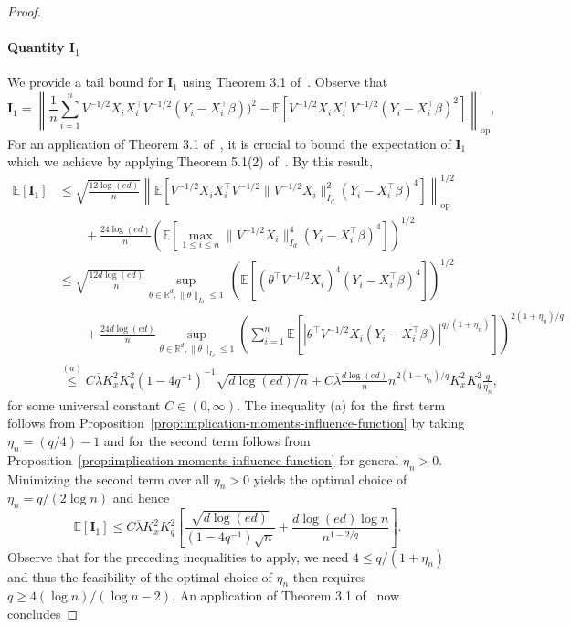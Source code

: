 \documentclass[11pt]{article}
\begin{document}
\begin{appendices}
\begin{proof}
\paragraph{Quantity $\mathbf{I}_1$} We provide a tail bound for $\mathbf{I}_1$ using Theorem 3.1 of~\cite{einmahl2008characterization}.
Observe that
\[
\mathbf{I}_1 = \left\|\frac{1}{n}\sum_{i=1}^n V^{-1/2}X_iX_i^{\top}V^{-1/2}(Y_i - X_i^{\top}\beta))^2 - \mathbb{E}[V^{-1/2}X_iX_i^{\top}V^{-1/2}(Y_i - X_i^{\top}\beta)^2]\right\|_{\mathrm{op}},
\] 
For an application of Theorem 3.1 of~\cite{einmahl2008characterization}, it is crucial to bound the expectation of $\mathbf{I}_1$ which we achieve by applying Theorem 5.1(2) of~\cite{tropp2016expected}. By this result,
\begin{align*}
\mathbb{E}[\mathbf{I}_1] &\le \sqrt{\frac{12\log(ed)}{n}}\left\|\mathbb{E}[V^{-1/2}X_iX_i^{\top}V^{-1/2}\|V^{-1/2}X_i\|^2_{I_d}(Y_i - X_i^{\top}\beta)^4]\right\|_{\mathrm{op}}^{1/2}\\ 
&\qquad+ \frac{24\log(ed)}{n}\left(\mathbb{E}\left[\max_{1\le i\le n}\|V^{-1/2}X_i\|_{I_d}^4(Y_i - X_i^{\top}\beta)^4\right]\right)^{1/2}\\
&\le \sqrt{\frac{12d\log(ed)}{n}}\sup_{\theta\in\mathbb{R}^d,\|\theta\|_{I_d} \le 1}\,\left(\mathbb{E}\left[(\theta^{\top}V^{-1/2}X_i)^4(Y_i - X_i^{\top}\beta)^4\right]\right)^{1/2}\\
&\qquad+ \frac{24d\log(ed)}{n}\sup_{\theta\in\mathbb{R}^d,\|\theta\|_{I_d} \le 1}\left(\sum_{i=1}^n \mathbb{E}\left[|\theta^{\top}V^{-1/2}X_i(Y_i - X_i^{\top}\beta)|^{q/(1 + \eta_n)}\right]\right)^{2(1 + \eta_n)/q}\\
&\overset{(a)}{\le} C\overline{\lambda}K_x^2K_q^2(1-4q^{-1})^{-1}\sqrt{d\log(ed)/n} + C\overline{\lambda}\frac{d\log(ed)}{n}n^{2(1+\eta_n)/q}K_x^2K_q^2\frac{q}{\eta_n},
\end{align*}
for some universal constant $C\in(0,\infty)$. The inequality (a) for the first term follows from Proposition~\ref{prop:implication-moments-influence-function} by taking $\eta_n = (q/4) - 1$ and for the second term follows from Proposition~\ref{prop:implication-moments-influence-function} for general $\eta_n > 0$. Minimizing the second term over all $\eta_n > 0$ yields the optimal choice of $\eta_n = q/(2\log n)$ and hence
\[
\mathbb{E}[\mathbf{I}_1] \le C\overline{\lambda}K_x^2K_q^2\left[\frac{\sqrt{d\log(ed)}}{(1 - 4q^{-1})\sqrt{n}} + \frac{d\log(ed)\log n}{n^{1 - 2/q}}\right].
\] 
Observe that for the preceding inequalities to apply, we need $4 \le q/(1 + \eta_n)$ and thus the feasibility of the optimal choice of $\eta_n$ then requires $q \ge 4(\log n)/(\log n - 2)$. An application of Theorem 3.1 of~\cite{einmahl2008characterization} now concludes

\end{proof}
\end{appendices}
\end{document}
